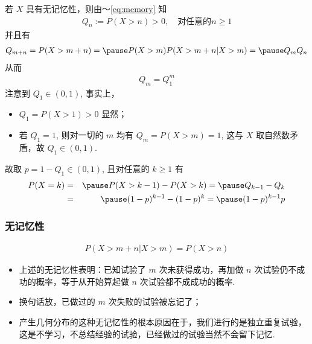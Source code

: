 \begin{frame}
	\vspace{0.5cm}
	若 $X$ 具有无记忆性，则由～\eqref{eq:memory} 知
	\pause \begin{eqnarray*}
		Q_n:=P (X>n)>0, \quad \mbox{对任意的} n\ge 1
	\end{eqnarray*}
	\pause 并且有
	\begin{eqnarray*}
		Q_{m+n}=P(X>m+n)=\pause P(X>m)P(X>m+n|X>m)=\pause Q_mQ_n
	\end{eqnarray*}
	\pause 从而 \vspace{-0.7cm}
	\begin{eqnarray*}
		Q_m=Q_1^m
	\end{eqnarray*}
	\pause 注意到 $Q_1\in (0,1)$, 事实上，
	\begin{itemize}[<+-|alert@+>]
		\item $Q_1=P (X>1)>0$ 显然；
		\item  若 $Q_1=1$, 则对一切的 $m$ 均有 $Q_m=P (X>m)=1$, 这与 $X$ 取自然数矛盾，故 $Q_1\in (0,1)$.
	\end{itemize}
	\pause 故取 $p=1-Q_1\in (0,1)$, 且对任意的 $k\ge 1$ 有
	\begin{eqnarray*}
		P(X=k)&=&\pause P(X>k-1)-P(X>k)=\pause Q_{k-1}-Q_k\\
		&=&\pause (1-p)^{k-1}-(1-p)^k=\pause (1-p)^{k-1}p
	\end{eqnarray*}

\end{frame}

\begin{frame}
	\frametitle{无记忆性}
	\begin{eqnarray*}
		P(X>m+n|X>m)=P(X>n)
	\end{eqnarray*}
	\begin{itemize}[<+-|alert@+>]
		\item 上述的无记忆性表明：已知试验了 $m$ 次未获得成功，再加做 $n$ 次试验仍不成功的概率，等于从开始算起做 $n$ 次试验都不成成功的概率.
		\item 换句话放，已做过的 $m$ 次失败的试验被忘记了；
		\item 产生几何分布的这种无记忆性的根本原因在于，我们进行的是独立重复试验，这是不学习，不总结经验的试验，已经做过的试验当然不会留下记忆.
	\end{itemize}
\end{frame}

